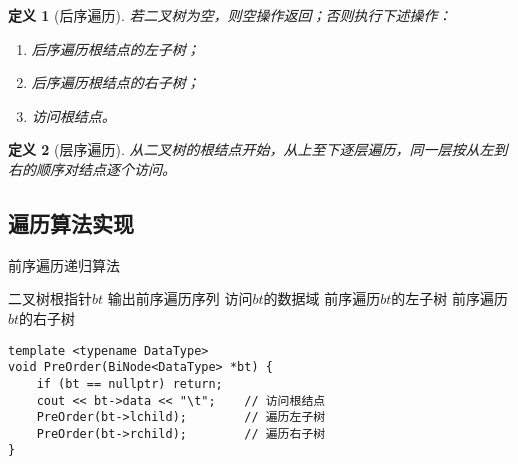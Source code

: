 \documentclass[12pt,a4paper]{amsart}
\newtheorem{definition}{定义}[section]
\begin{document}
\begin{definition}[后序遍历]
若二叉树为空，则空操作返回；否则执行下述操作：
\begin{enumerate}
\item 后序遍历根结点的左子树；
\item 后序遍历根结点的右子树；
\item 访问根结点。
\end{enumerate}
\end{definition}

\begin{definition}[层序遍历]
从二叉树的根结点开始，从上至下逐层遍历，同一层按从左到右的顺序对结点逐个访问。
\end{definition}

\subsection{遍历算法实现}

\noindent

\begin{algorithm}[H]
\caption{前序遍历递归算法}
\begin{algorithmic}[1]
\REQUIRE 二叉树根指针$bt$
\ENSURE 输出前序遍历序列
\STATE 访问$bt$的数据域
\STATE 前序遍历$bt$的左子树
\STATE 前序遍历$bt$的右子树
\ENDIF
\end{algorithmic}
\end{algorithm}

\begin{lstlisting}[caption=前序遍历递归实现]
template <typename DataType>
void PreOrder(BiNode<DataType> *bt) {
    if (bt == nullptr) return;
    cout << bt->data << "\t";    // 访问根结点
    PreOrder(bt->lchild);        // 遍历左子树
    PreOrder(bt->rchild);        // 遍历右子树
}
\end{lstlisting}
\end{document}
